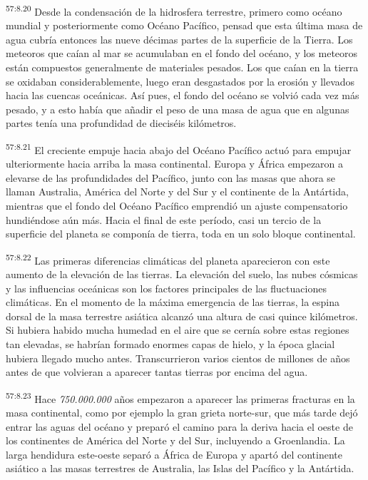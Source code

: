 \par
\textsuperscript{57:8.20} Desde la condensación de la hidrosfera terrestre, primero como océano mundial y posteriormente como Océano Pacífico, pensad que esta última masa de agua cubría entonces las nueve décimas partes de la superficie de la Tierra. Los meteoros que caían al mar se acumulaban en el fondo del océano, y los meteoros están compuestos generalmente de materiales pesados. Los que caían en la tierra se oxidaban considerablemente, luego eran desgastados por la erosión y llevados hacia las cuencas oceánicas. Así pues, el fondo del océano se volvió cada vez más pesado, y a esto había que añadir el peso de una masa de agua que en algunas partes tenía una profundidad de dieciséis kilómetros.

\par
\textsuperscript{57:8.21} El creciente empuje hacia abajo del Océano Pacífico actuó para empujar ulteriormente hacia arriba la masa continental. Europa y África empezaron a elevarse de las profundidades del Pacífico, junto con las masas que ahora se llaman Australia, América del Norte y del Sur y el continente de la Antártida, mientras que el fondo del Océano Pacífico emprendió un ajuste compensatorio hundiéndose aún más. Hacia el final de este período, casi un tercio de la superficie del planeta se componía de tierra, toda en un solo bloque continental.

\par
\textsuperscript{57:8.22} Las primeras diferencias climáticas del planeta aparecieron con este aumento de la elevación de las tierras. La elevación del suelo, las nubes cósmicas y las influencias oceánicas son los factores principales de las fluctuaciones climáticas. En el momento de la máxima emergencia de las tierras, la espina dorsal de la masa terrestre asiática alcanzó una altura de casi quince kilómetros. Si hubiera habido mucha humedad en el aire que se cernía sobre estas regiones tan elevadas, se habrían formado enormes capas de hielo, y la época glacial hubiera llegado mucho antes. Transcurrieron varios cientos de millones de años antes de que volvieran a aparecer tantas tierras por encima del agua.

\par
\textsuperscript{57:8.23} Hace \textit{750.000.000} años empezaron a aparecer las primeras fracturas en la masa continental, como por ejemplo la gran grieta norte-sur, que más tarde dejó entrar las aguas del océano y preparó el camino para la deriva hacia el oeste de los continentes de América del Norte y del Sur, incluyendo a Groenlandia. La larga hendidura este-oeste separó a África de Europa y apartó del continente asiático a las masas terrestres de Australia, las Islas del Pacífico y la Antártida.

